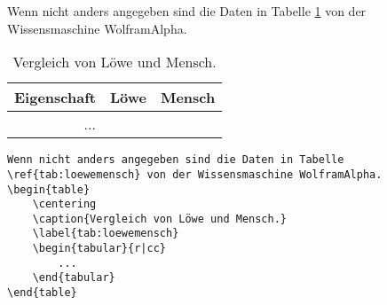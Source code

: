 \documentclass["WS\space 16-17\space -\space LaTeX-Kurs\space -\space Praesentation\space -\space 3.tex"]{subfiles}
\begin{document}
\begin{frame}
	\Losung
	\begin{outputbox}
		Wenn nicht anders angegeben sind die Daten in Tabelle \ref{tab:loewemensch} von der Wissensmaschine WolframAlpha.
		\vspace{-0.5cm}
		\begin{table}
			\centering
			\caption{Vergleich von Löwe und Mensch.}
			\label{tab:loewemensch}
			\vspace{-0.2cm}
			\begin{tabular}{r|cc}
				\hline
				\textbf{Eigenschaft}														&	\textbf{Löwe}	& \textbf{Mensch} \\\hline
				... &&
			\end{tabular}
		\end{table}
	\end{outputbox}
	
	\Code
	\begin{lstlisting}
Wenn nicht anders angegeben sind die Daten in Tabelle \ref{tab:loewemensch} von der Wissensmaschine WolframAlpha.	
\begin{table}
	\centering
	\caption{Vergleich von Löwe und Mensch.}
	\label{tab:loewemensch}
	\begin{tabular}{r|cc}
		...
	\end{tabular}
\end{table}
	\end{lstlisting}
\end{frame}
\end{document}
